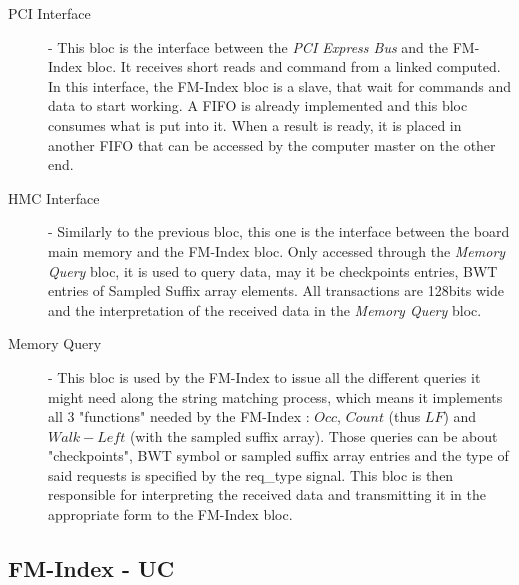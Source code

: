 \begin{description}
\item [PCI Interface] - This bloc is the interface between the \textsl{PCI Express Bus} and the FM-Index bloc. It receives short reads and command from a linked computed. In this interface, the FM-Index bloc is a slave, that wait for commands and data to start working. A FIFO is already implemented and this bloc consumes what is put into it. When a result is ready, it is placed in another FIFO that can be accessed by the computer master on the other end.
\item [HMC Interface] - Similarly to the previous bloc, this one is the interface between the board main memory and the FM-Index bloc. Only accessed through the \textsl{Memory Query} bloc, it is used to query data, may it be checkpoints entries, BWT entries of Sampled Suffix array elements. All transactions are 128bits wide and the interpretation of the received data in the \textsl{Memory Query} bloc.
\item [Memory Query] - This bloc is used by the FM-Index to issue all the different queries it might need along the string matching process, which means it implements all 3 "functions" needed by the FM-Index : $Occ$, $Count$ (thus $LF$) and $Walk-Left$ (with the sampled suffix array). Those queries can be about "checkpoints", BWT symbol or sampled suffix array entries and the type of said requests is specified by the \textrm{req\_type} signal. This bloc is then responsible for interpreting the received data and transmitting it in the appropriate form to the FM-Index bloc.
\end{description}

\subsection{FM-Index - UC}

